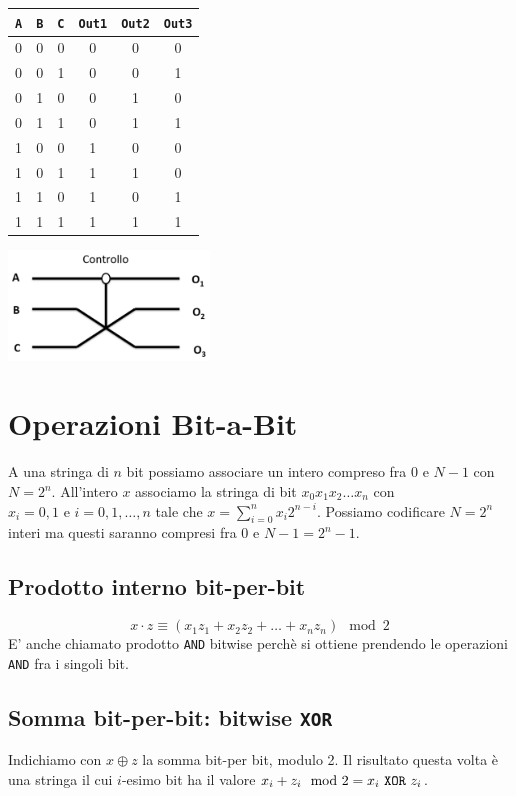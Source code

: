\documentclass[12pt, a4paper]{report}
\begin{document}
\begin{center}
    \begin{tabular}{|c|c|c|c|c|c|}
    \hline
    \texttt{A} & \texttt{B} & \texttt{C} & \texttt{Out1} & \texttt{Out2} & \texttt{Out3} \\
    \hline
    0 & 0 & 0 & 0 & 0 & 0 \\
    \hline
    0 & 0 & 1 & 0 & 0 & 1 \\
    \hline
    0 & 1 & 0 & 0 & 1 & 0 \\
    \hline
    0 & 1 & 1 & 0 & 1 & 1 \\
    \hline
    1 & 0 & 0 & 1 & 0 & 0 \\
    \hline
    1 & 0 & 1 & 1 & 1 & 0 \\
    \hline
    1 & 1 & 0 & 1 & 0 & 1 \\
    \hline
    1 & 1 & 1 & 1 & 1 & 1 \\
    \hline
    \end{tabular}
    \includegraphics[width=0.4\textwidth]{Immagini/fredkin_circuit.png}
\end{center}
\section{Operazioni Bit-a-Bit}
A una stringa di $n$ bit possiamo associare un intero compreso fra 0 e $N-1$ con $N=2^n$. All'intero $x$ associamo la stringa di bit $x_0x_1x_2\dots x_{n}$ con $x_{i}=0,1 \text{ e } i=0,1,\dots,n$ tale che $x=\sum_{i=0}^{n}x_{i}2^{n-i}$. Possiamo codificare $N=2^{n}$ interi ma questi saranno compresi fra 0 e $N-1=2^{n}-1$.
\subsection{Prodotto interno bit-per-bit}
\begin{equation*}
    x\cdot z \equiv (x_{1}z_{1} + x_{2}z_{2} + \dots + x_{n}z_{n}) \mod 2
\end{equation*}
E' anche chiamato prodotto \texttt{AND} bitwise perchè si ottiene prendendo le operazioni \texttt{AND} fra i singoli bit.
\subsection{Somma bit-per-bit: bitwise \texttt{XOR}}
Indichiamo con $x\oplus z$ la somma bit-per bit, modulo 2. Il risultato questa volta è una stringa il cui $i$-esimo bit ha il valore $x_{i}+z_{i} \mod 2 = x_{i} \text{ \texttt{XOR} } z_{i}$.
\end{document}
